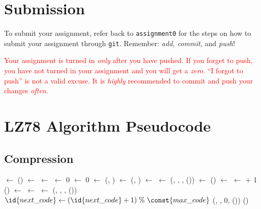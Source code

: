 \documentclass{article}
\begin{document}
\section{Submission}

To submit your assignment, refer back to \texttt{assignment0} for the steps on
how to submit your assignment through \texttt{git}. Remember:
\emph{add, commit,} and \emph{push}!

\textcolor{red}{Your assignment is turned in \emph{only} after you have pushed.
If you forget to push, you have not turned in your assignment and you will get
a \emph{zero}. ``I forgot to push'' is not a valid excuse. It is \emph{highly}
recommended to commit and push your changes \emph{often}.}

\appendix
\section{LZ78 Algorithm Pseudocode}

\subsection{Compression}

\begin{codebox}
    \li {} $\gets$ ()
    \li {} $\gets$ 
    \li {} $\gets$ 
    \li {} $\gets$ 0
    \li {} $\gets$ 0
    \li {} $\gets$ 
    \li \While {}(, )  
    \li \Then {} $\gets$ (,
              )
              \li     \If {}  
    \li     \Then {} $\gets$ 
    \li           {} $\gets$ 
    \li     \Else
    \li           {}(,
                  , ,
                  ())
    \li           {} $\gets$
                    ()
    \li           {} $\gets$ 
    \li {} $\gets$  + 1
            \End
            \li     \If {}  
    \li     \Then {}()
    \li           {} $\gets$ 
    \li           {} $\gets$ 
            \End
    \li     {} $\gets$ 
        \End
        \li \If {}  
    \li \Then {}(,
    , ,
    ())
    \li $\id{next\_code} \gets (\id{next\_code} + 1) \;\%\;\const{max\_code}$
        \End
        \li {}(, , 0,
        ())
        \li {}()
\end{codebox}
\end{document}
